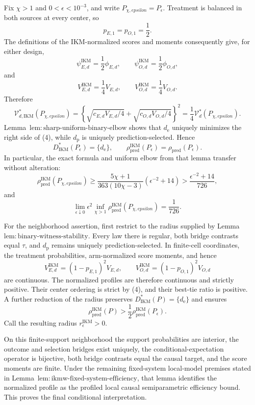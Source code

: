 Fix \(\chi>1\) and \(0<\epsilon<10^{-3}\), and write \(P_{\chi,epsilon}=P_\epsilon\). Treatment is balanced in both sources at every center, so
\[
 p_{E,1}=p_{O,1}=\frac12.                              \tag{1}
\]
The definitions of the IKM-normalized scores and moments consequently give, for either design,
\[
 \psi_{E,d}^{\mathrm{IKM}}=\frac12\phi_{E,d},
 \qquad
 \psi_{O,d}^{\mathrm{IKM}}=\frac12\phi_{O,d},         \tag{2}
\]
and
\[
 V_{E,d}^{\mathrm{IKM}}=\frac14V_{E,d},
 \qquad
 V_{O,d}^{\mathrm{IKM}}=\frac14V_{O,d}.               \tag{3}
\]
Therefore
\[
 \mathcal V_{d,\mathrm{IKM}}^*(P_{\chi,epsilon})
 =\left\{\sqrt{c_{E,d}V_{E,d}/4}
 +\sqrt{c_{O,d}V_{O,d}/4}\right\}^2
 =\frac14\mathcal V_d^*(P_{\chi,epsilon}).           \tag{4}
\]
Lemma~\(\mathrm{lem{:}sharp\text{-}uniform\text{-}binary\text{-}elbow}\) shows that \(d_{\mathrm e}\) uniquely minimizes the right side of (4), while \(d_{\mathrm p}\) is uniquely prediction-selected. Hence
\[
 D_{\mathrm{IKM}}^*(P_\epsilon)=\{d_{\mathrm e}\},
 \qquad
 \rho_{\mathrm{pred}}^{\mathrm{IKM}}(P_\epsilon)
 =\rho_{\mathrm{pred}}(P_\epsilon).                   \tag{5}
\]
In particular, the exact formula and uniform elbow from that lemma transfer without alteration:
\[
 \rho_{\mathrm{pred}}^{\mathrm{IKM}}(P_{\chi,epsilon})
 \ge\frac{5\chi+1}{363(10\chi-3)}(\epsilon^{-2}+14)
 >\frac{\epsilon^{-2}+14}{726},                       \tag{6}
\]
and
\[
 \lim_{\epsilon\downarrow0}\epsilon^2
 \inf_{\chi>1}\rho_{\mathrm{pred}}^{\mathrm{IKM}}(P_{\chi,epsilon})
 =\frac1{726}.                                         \tag{7}
\]

For the neighborhood assertion, first restrict to the radius supplied by Lemma~\(\mathrm{lem{:}binary\text{-}witness\text{-}stability}\). Every law there is regular, both bridge contrasts equal \(\tau\), and \(d_{\mathrm p}\) remains uniquely prediction-selected. In finite-cell coordinates, the treatment probabilities, arm-normalized score moments, and hence
\[
 V_{E,d}^{\mathrm{IKM}}=(1-p_{E,1})^2V_{E,d},
 \qquad
 V_{O,d}^{\mathrm{IKM}}=(1-p_{O,1})^2V_{O,d}           \tag{8}
\]
are continuous. The normalized profiles are therefore continuous and strictly positive. Their center ordering is strict by (4), and their best-tie ratio is positive. A further reduction of the radius preserves \(D_{\mathrm{IKM}}^*(P)=\{d_{\mathrm e}\}\) and ensures
\[
 \rho_{\mathrm{pred}}^{\mathrm{IKM}}(P)
 >\frac12\rho_{\mathrm{pred}}^{\mathrm{IKM}}(P_\epsilon).
\]
Call the resulting radius \(r_\epsilon^{\mathrm{IKM}}>0\).

On this finite-support neighborhood the support probabilities are interior, the outcome and selection bridges exist uniquely, the conditional-expectation operator is bijective, both bridge contrasts equal the causal target, and the score moments are finite. Under the remaining fixed-system local-model premises stated in Lemma~\(\mathrm{lem{:}ikmw\text{-}fixed\text{-}system\text{-}efficiency}\), that lemma identifies the normalized profile as the profiled local causal semiparametric efficiency bound. This proves the final conditional interpretation.